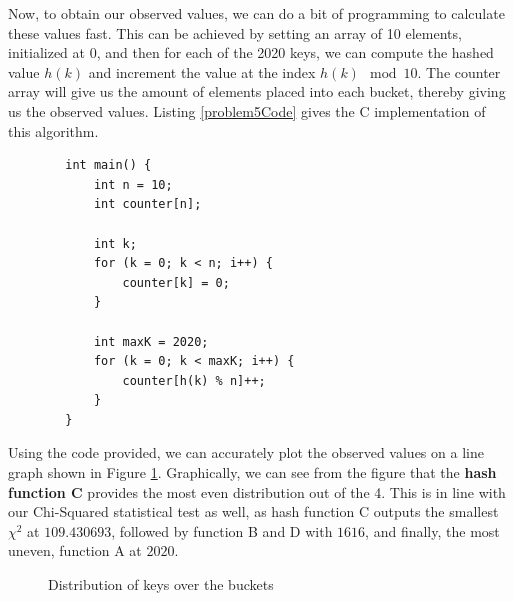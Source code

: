 \documentclass{report}
\begin{document}
Now, to obtain our observed values, we can do a bit of programming to calculate these values fast. This can be achieved by setting an array of 10 elements, initialized at 0, and then for each of the 2020 keys, we can compute the hashed value $h(k)$ and increment the value at the index $h(k) \mod 10$. The counter array will give us the amount of elements placed into each bucket, thereby giving us the observed values. Listing \ref{problem5Code} gives the C implementation of this algorithm.
\begin{listing}[h]
	\begin{verbatim}
		int main() {
			int n = 10;
			int counter[n];
			
			int k;
			for (k = 0; k < n; i++) {
				counter[k] = 0;
			}
			
			int maxK = 2020;
			for (k = 0; k < maxK; i++) {
				counter[h(k) % n]++;
			}
		}
	\end{verbatim}
	\caption{Counting algorithm to produce the observed values.}
	\label{problem5Code}
\end{listing}

Using the code provided, we can accurately plot the observed values on a line graph shown in Figure \ref{problem5Graph}. Graphically, we can see from the figure that the \textbf{hash function C} provides the most even distribution out of the 4. This is in line with our Chi-Squared statistical test as well, as hash function C outputs the smallest $\chi^2$ at $109.430693$, followed by function B and D with $1616$, and finally, the most uneven, function A at $2020$.
\begin{figure}[h]
	\centering
	\caption{Distribution of keys over the buckets}
	\label{problem5Graph}
\end{figure}
\end{document}
